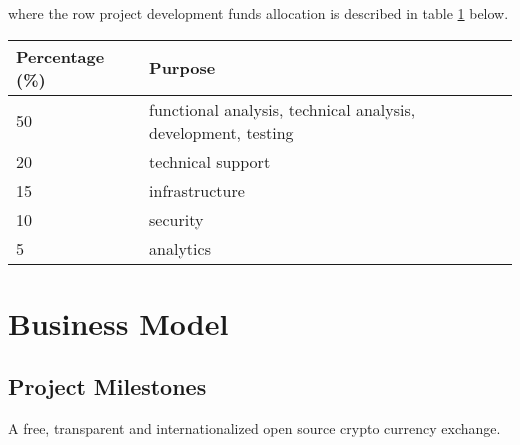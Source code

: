 \documentclass[11pt,fleqn,oneside]{book} %
\begin{document}
\vspace{5mm}
where the row project development funds allocation is described in table \ref{tab:focus} below.

\vspace{5mm}
\begin{table}[H]
	\centering
	\begin{tabular}{l l}
		\toprule
		\textbf{Percentage (\%)} & \textbf{Purpose} \\
		\midrule
		50		& functional analysis, technical analysis, development, testing	\\
		20		& technical support	\\
		15		& infrastructure	\\
		10		& security	\\
		5		& analytics	\\
		\bottomrule
	\end{tabular}
	\label{tab:focus}
\end{table}



\chapter{Business Model}

\section{Project Milestones}
A free, transparent and internationalized open source crypto currency exchange.\\
\end{document}

